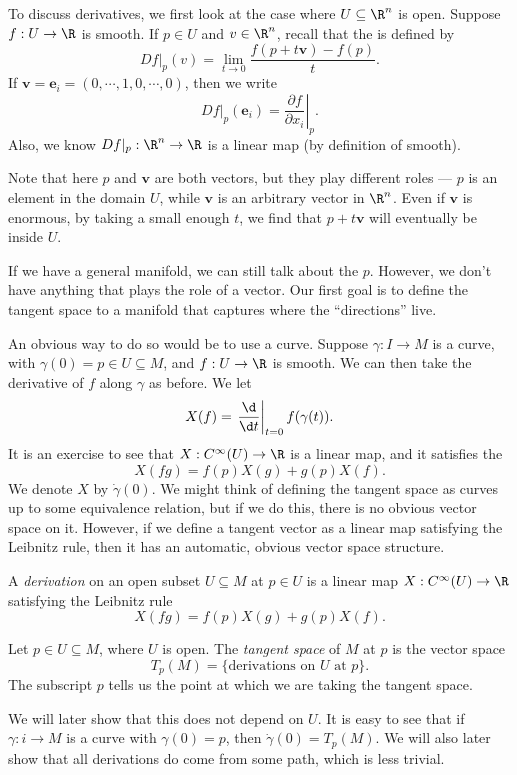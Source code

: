 \documentclass[a4paper]{article}
\begin{document}
To discuss derivatives, we first look at the case where $U \subseteq \R^n$ is open. Suppose $f: U \to \R$ is smooth. If $p \in U$ and $v \in \R^n$, recall that the  is defined by
\[
  Df|_p(v) = \lim_{t \to 0} \frac{f(p + t\mathbf{v}) - f(p)}{t}.
\]
If $\mathbf{v} = \mathbf{e}_i = (0, \cdots, 1, 0, \cdots, 0)$, then we write
\[
  Df|_p (\mathbf{e}_i) = \left.\frac{\partial f}{\partial x_i}\right|_p.
\]
Also, we know $Df|_p: \R^n \to \R$ is a linear map (by definition of smooth).

Note that here $p$ and $\mathbf{v}$ are both vectors, but they play different roles --- $p$ is an element in the domain $U$, while $\mathbf{v}$ is an arbitrary vector in $\R^n$. Even if $\mathbf{v}$ is enormous, by taking a small enough $t$, we find that $p + t\mathbf{v}$ will eventually be inside $U$.

If we have a general manifold, we can still talk about the $p$. However, we don't have anything that plays the role of a vector. Our first goal is to define the tangent space to a manifold that captures where the ``directions'' live.

An obvious way to do so would be to use a curve. Suppose $\gamma: I \to M$ is a curve, with $\gamma(0) = p \in U \subseteq M$, and $f: U \to \R$ is smooth. We can then take the derivative of $f$ along $\gamma$ as before. We let
\[
  X(f) = \left.\frac{\d}{\d t}\right|_{t = 0} f(\gamma(t)).
\]
It is an exercise to see that $X: C^\infty(U) \to \R$ is a linear map, and it satisfies the 
\[
  X(fg) = f(p) X(g) + g(p) X(f).
\]
We denote $X$ by $\dot{\gamma}(0)$. We might think of defining the tangent space as curves up to some equivalence relation, but if we do this, there is no obvious vector space on it. However, if we define a tangent vector as a linear map satisfying the Leibnitz rule, then it has an automatic, obvious vector space structure.
\begin{defi}[Derivation]
  A \emph{derivation} on an open subset $U \subseteq M$ at $p \in U$ is a linear map $X: C^\infty(U) \to \R$ satisfying the Leibnitz rule
  \[
    X(fg) = f(p) X(g) + g(p) X(f).
  \]
\end{defi}

\begin{defi}
  Let $p \in U \subseteq M$, where $U$ is open. The \emph{tangent space} of $M$ at $p$ is the vector space
  \[
    T_p(M) = \{\text{derivations on $U$ at $p$}\}.
  \]
  The subscript $p$ tells us the point at which we are taking the tangent space.
\end{defi}
We will later show that this does not depend on $U$. It is easy to see that if $\gamma: i \to M$ is a curve with $\gamma(0) = p$, then $\dot{\gamma}(0) = T_p(M)$. We will also later show that all derivations do come from some path, which is less trivial.
\end{document}
